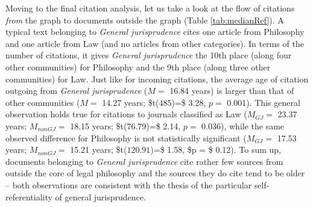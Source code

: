 \documentclass[
]{article}
\begin{document}
Moving to the final citation analysis, let us take a look at the flow of citations \emph{from} the graph to documents outside the graph (Table \ref{tab:medianRef}). A typical text belonging to \emph{General jurisprudence} cites one article from Philosophy and one article from Law (and no articles from other categories). In terms of the number of citations, it gives \emph{General jurisprudence} the 10th place (along four other communities) for Philosophy and the 9th place (along three other communities) for Law. Just like for incoming citations, the average age of citation outgoing from \emph{General jurisprudence} (\(M =\) 16.84 years) is larger than that of other communities (\(M =\) 14.27 years; \$t(\(485\))=\$ 3.28, \(p =\) 0.001). This general observation holds true for citations to journals classified as Law (\(M_{GJ} =\) 23.37 years; \(M_{nonGJ} =\) 18.15 years; \$t(\(76.79\))=\$ 2.14, \(p =\) 0.036), while the same observed difference for Philosophy is not statistically significant (\(M_{GJ} =\) 17.53 years; \(M_{nonGJ} =\) 15.21 years; \$t(\(120.91\))=\$ 1.58, \$p = \$ 0.12). To sum up, documents belonging to \emph{General jurisprudence} cite rather few sources from outside the core of legal philosophy and the sources they do cite tend to be older -- both observations are consistent with the thesis of the particular self-referentiality of general jurisprudence.
\end{document}
